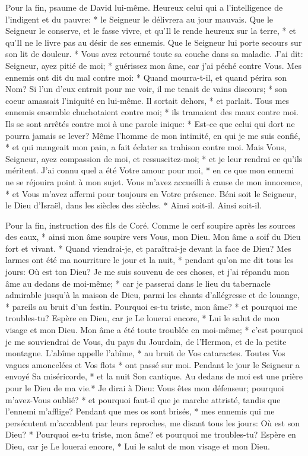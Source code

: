 Pour la fin, psaume de David lui-même.
Heureux celui qui a l'intelligence de l'indigent et du pauvre: * le Seigneur le délivrera au jour mauvais.
Que le Seigneur le conserve, et le fasse vivre, et qu'Il le rende heureux sur la terre, * et qu'Il ne le livre pas au désir de ses ennemis.
Que le Seigneur lui porte secours sur son lit de douleur. * Vous avez retourné toute sa couche dans sa maladie.
J'ai dit: Seigneur, ayez pitié de moi; * guérissez mon âme, car j'ai péché contre Vous.
Mes ennemis ont dit du mal contre moi: * Quand mourra-t-il, et quand périra son Nom?
Si l'un d'eux entrait pour me voir, il me tenait de vains discours; * son coeur amassait l'iniquité en lui-même. Il sortait dehors, * et parlait.
Tous mes ennemis ensemble chuchotaient contre moi; * ils tramaient des maux contre moi.
Ils se sont arrêtés contre moi à une parole inique: * Est-ce que celui qui dort ne pourra jamais se lever?
Même l'homme de mon intimité, en qui je me suis confié, * et qui mangeait mon pain, a fait éclater sa trahison contre moi.
Mais Vous, Seigneur, ayez compassion de moi, et ressuscitez-moi; * et je leur rendrai ce qu'ils méritent.
J'ai connu quel a été Votre amour pour moi, * en ce que mon ennemi ne se réjouira point à mon sujet.
Vous m'avez accueilli à cause de mon innocence, * et Vous m'avez affermi pour toujours en Votre présence.
Béni soit le Seigneur, le Dieu d'Israël, dans les siècles des siècles. * Ainsi soit-il. Ainsi soit-il.

Pour la fin, instruction des fils de Coré.
Comme le cerf soupire après les sources des eaux, * ainsi mon âme soupire vers Vous, mon Dieu.
Mon âme a soif du Dieu fort et vivant. * Quand viendrai-je, et paraîtrai-je devant la face de Dieu?
Mes larmes ont été ma nourriture le jour et la nuit, * pendant qu'on me dit tous les jours: Où est ton Dieu?
Je me suis souvenu de ces choses, et j'ai répandu mon âme au dedans de moi-même; * car je passerai dans le lieu du tabernacle admirable jusqu'à la maison de Dieu, parmi les chants d'allégresse et de louange, * pareils au bruit d'un festin.
Pourquoi es-tu triste, mon âme? * et pourquoi me troubles-tu? Espère en Dieu, car je Le louerai encore, * Lui le salut de mon visage
et mon Dieu. Mon âme a été toute troublée en moi-même; * c'est pourquoi je me souviendrai de Vous, du pays du Jourdain, de l'Hermon, et de la petite montagne.
L'abîme appelle l'abîme, * au bruit de Vos cataractes. Toutes Vos vagues amoncelées et Vos flots * ont passé sur moi.
Pendant le jour le Seigneur a envoyé Sa miséricorde, * et la nuit Son cantique. Au dedans de moi est une prière pour le Dieu de ma vie.*
Je dirai à Dieu: Vous êtes mon défenseur; pourquoi m'avez-Vous oublié? * et pourquoi faut-il que je marche attristé, tandis que l'ennemi m'afflige?
Pendant que mes os sont brisés, * mes ennemis qui me persécutent m'accablent par leurs reproches, me disant tous les jours: Où est son Dieu? *
Pourquoi es-tu triste, mon âme? et pourquoi me troubles-tu? Espère en Dieu, car je Le louerai encore, * Lui le salut de mon visage et mon Dieu.

